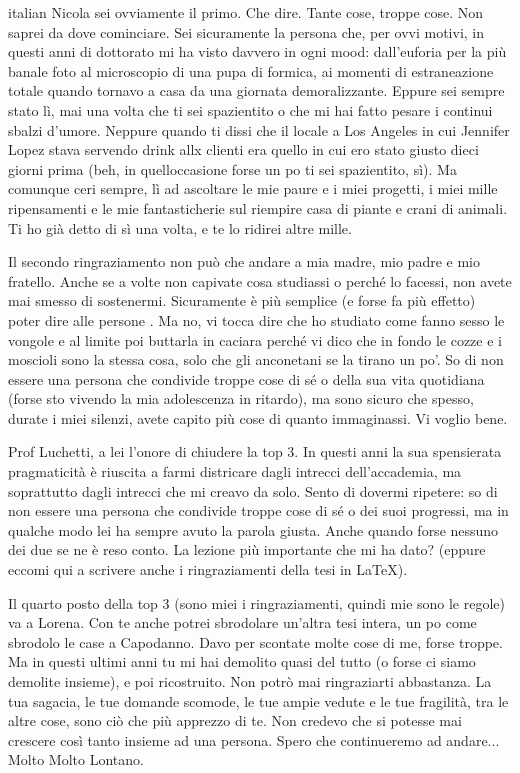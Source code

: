 \begin{otherlanguage*}{italian}
Nicola sei ovviamente il primo. Che dire. Tante cose, troppe cose. Non saprei da dove cominciare. Sei sicuramente la persona che, per ovvi motivi, in questi anni di dottorato mi ha visto davvero in ogni mood: dall'euforia per la più banale foto al microscopio di una pupa di formica, ai momenti di estraneazione totale quando tornavo a casa da una giornata demoralizzante. Eppure sei sempre stato lì, mai una volta che ti sei spazientito o che mi hai fatto pesare i continui sbalzi d'umore. Neppure quando ti dissi che il locale a Los Angeles in cui Jennifer Lopez stava servendo drink allx clienti era quello in cui ero stato giusto dieci giorni prima (beh, in quell\curlyapostrophe{}occasione forse un po\curlyapostrophe{} ti sei spazientito, sì). Ma comunque c\curlyapostrophe{}eri sempre, lì ad ascoltare le mie paure e i miei progetti, i miei mille ripensamenti e le mie fantasticherie sul riempire casa di piante e crani di animali. Ti ho già detto di sì una volta, e te lo ridirei altre mille.

Il secondo ringraziamento non può che andare a mia madre, mio padre e mio fratello. Anche se a volte non capivate cosa studiassi o perché lo facessi, non avete mai smesso di sostenermi. Sicuramente è più semplice (e forse fa più effetto) poter dire alle persone . Ma no, vi tocca dire che ho studiato come fanno sesso le vongole e al limite poi buttarla in caciara perché vi dico che in fondo le cozze e i moscioli sono la stessa cosa, solo che gli anconetani se la tirano un po'. So di non essere una persona che condivide troppe cose di sé o della sua vita quotidiana (forse sto vivendo la mia adolescenza in ritardo), ma sono sicuro che spesso, durate i miei silenzi, avete capito più cose di quanto immaginassi. Vi voglio bene.

Prof Luchetti, a lei l'onore di chiudere la top 3. In questi anni la sua spensierata pragmaticità è riuscita a farmi districare dagli intrecci dell'accademia, ma soprattutto dagli intrecci che mi creavo da solo. Sento di dovermi ripetere: so di non essere una persona che condivide troppe cose di sé o dei suoi progressi, ma in qualche modo lei ha sempre avuto la parola giusta. Anche quando forse nessuno dei due se ne è reso conto. La lezione più importante che mi ha dato?  (eppure eccomi qui a scrivere anche i ringraziamenti della tesi in \LaTeX).

Il quarto posto della top 3 (sono miei i ringraziamenti, quindi mie sono le regole) va a Lorena. Con te anche potrei sbrodolare un'altra tesi intera, un po\curlyapostrophe{} come sbrodolo le case a Capodanno. Davo per scontate molte cose di me, forse troppe. Ma in questi ultimi anni tu mi hai demolito quasi del tutto (o forse ci siamo demolite insieme), e poi ricostruito. Non potrò mai ringraziarti abbastanza. La tua sagacia, le tue domande scomode, le tue ampie vedute e le tue fragilità, tra le altre cose, sono ciò che più apprezzo di te. Non credevo che si potesse mai crescere così tanto insieme ad una persona. Spero che continueremo ad andare... Molto Molto Lontano.


\end{otherlanguage*}

